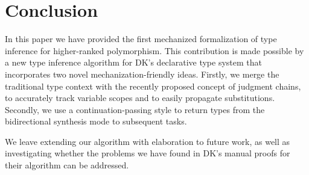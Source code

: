 \section{Conclusion}

In this paper we have provided the first mechanized formalization of type
inference for higher-ranked polymorphism. This contribution is made possible by
a new type inference algorithm for DK's declarative type system that
incorporates two novel mechanization-friendly ideas. Firstly, we merge the
traditional type context with the recently proposed concept of judgment chains,
to accurately track variable scopes and to easily propagate substitutions.
Secondly, we use a continuation-passing style to return types from the
bidirectional synthesis mode to subsequent tasks. 

We leave extending our algorithm with elaboration to future work, as well as
investigating whether the problems we have found in DK's manual proofs for
their algorithm can be addressed.


